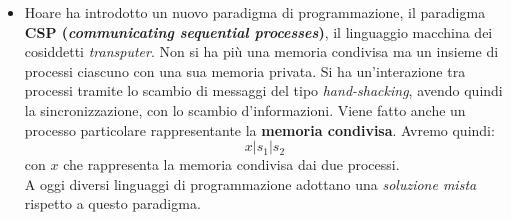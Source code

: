   \begin{itemize}
      \item Hoare ha introdotto un nuovo paradigma di
programmazione, il paradigma \textbf{CSP (\textit{communicating sequential
    processes})}, il linguaggio macchina dei cosiddetti \textit{transputer}. Non
si ha più una memoria condivisa ma un insieme di processi ciascuno con una sua
memoria privata. Si ha un'interazione tra processi tramite lo scambio di
messaggi del tipo \textit{hand-shacking}, avendo quindi la sincronizzazione, con
lo scambio d'informazioni. Viene fatto anche un processo particolare
rappresentante la \textbf{memoria condivisa}. Avremo quindi:
\[x|s_1|s_2\]
con $x$ che rappresenta la memoria condivisa dai due processi.\\
A oggi diversi linguaggi di programmazione adottano una \textit{soluzione mista}
rispetto a questo paradigma.


\end{itemize}
